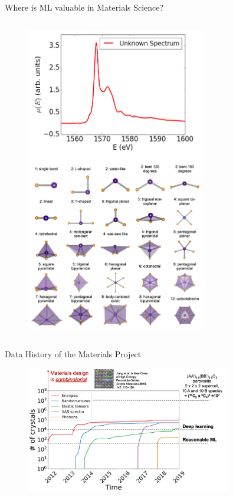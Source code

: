 \documentclass[aspectratio=169]{beamer}
\begin{document}
\begin{frame}[t]{Where is ML valuable in Materials Science?}
\begin{columns}[t]
\begin{figure}
        \centering
        \includegraphics[width=0.7\textwidth]{lectures/slides_tex/xas_interpretation.png}
    \end{figure}
\end{columns}
\end{frame}


\begin{frame}{Data History of the Materials Project}
    \begin{figure}
        \centering
        \includegraphics[width=0.8\textwidth]{lectures/slides_tex/mp_data_hist.png}
    \end{figure}
\end{frame}
\end{document}
